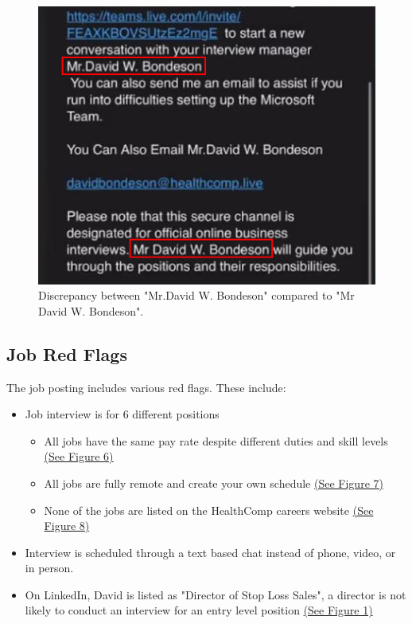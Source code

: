 \begin{fullwidth}
\begin{figure}[H] %
    \label{sec:Fig5}
    \centering
    \includegraphics[width=.75\linewidth]{assets/titleerror.png}
    \captionsetup{justification=centering}
    \caption{Discrepancy between "Mr.David W. Bondeson" compared to "Mr David W. Bondeson".}
\end{figure}

\subsection{Job Red Flags}
The job posting includes various red flags. These include:
\begin{itemize}
	\item Job interview is for 6 different positions
        \begin{itemize}
            \item All jobs have the same pay rate despite different duties and skill levels \hyperref[sec:Fig6]{(See Figure 6)}
            \item All jobs are fully remote and create your own schedule \hyperref[sec:Fig7]{(See Figure 7)}
            \item None of the jobs are listed on the HealthComp careers website \hyperref[sec:Fig8]{(See Figure 8)}
        \end{itemize}
    \item Interview is scheduled through a text based chat instead of phone, video, or in person.
    \item On LinkedIn, David is listed as "Director of Stop Loss Sales", a director is not likely to conduct an interview for an entry level position \hyperref[sec:Fig1]{(See Figure 1)}
\end{itemize}


\end{fullwidth}
